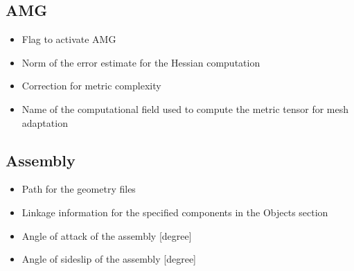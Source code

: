 \documentclass[letterpaper,10pt,english]{sphinxmanual}
\begin{document}
\subsection{AMG}
\label{\detokenize{usage:amg}}\begin{itemize}
\item {} 
\sphinxAtStartPar
{} \sphinxhyphen{} Flag to activate AMG

\item {} 
\sphinxAtStartPar
{} \sphinxhyphen{} Norm of the error estimate for the Hessian computation

\item {} 
\sphinxAtStartPar
{} \sphinxhyphen{} Correction for metric complexity

\item {} 
\sphinxAtStartPar
{} \sphinxhyphen{} Name of the computational field used to compute the metric tensor for mesh adaptation

\end{itemize}


\subsection{Assembly}
\label{\detokenize{usage:assembly}}\begin{itemize}
\item {} 
\sphinxAtStartPar
{} \sphinxhyphen{} Path for the geometry files

\item {} 
\sphinxAtStartPar
{} \sphinxhyphen{} Linkage information for the specified components in the Objects section

\item {} 
\sphinxAtStartPar
{} \sphinxhyphen{} Angle of attack of the assembly {[}degree{]}

\item {} 
\sphinxAtStartPar
{} \sphinxhyphen{} Angle of sideslip of the assembly {[}degree{]}

\end{itemize}
\end{document}

